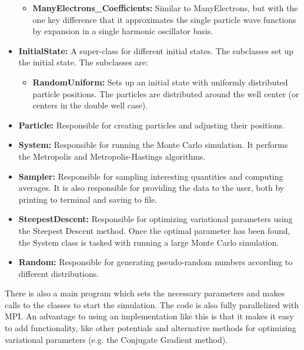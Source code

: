 \documentclass[../main.tex]{subfiles}
\begin{document}
\begin{appendices}
\begin{itemize}
\begin{itemize}
        \item \textbf{ManyElectrons\_Coefficients:} Similar to ManyElectrons, but with the one key difference that it approximates the single particle wave functions by expansion in a single harmonic oscillator basis.
    \end{itemize}
    \item {\bf InitialState:} A super-class for different initial states. The subclasses set up the initial state. The subclasses are:
    \begin{itemize}
        \item {\bf RandomUniform:} Sets up an initial state with uniformly distributed particle positions. The particles are distributed around the well center (or centers in the double well case).
    \end{itemize}
    \item {\bf Particle:} Responsible for creating particles and adjusting their positions.
    \item {\bf System:} Responsible for running the Monte Carlo simulation. It performs the Metropolis and Metropolis-Hastings algorithms.
    \item {\bf Sampler:} Responsible for sampling interesting quantities and computing averages. It is also responsible for providing the data to the user, both by printing to terminal and saving to file.
    \item {\bf SteepestDescent:} Responsible for optimizing variational parameters using the Steepest Descent method. Once the optimal parameter has been found, the System class is tasked with running a large Monte Carlo simulation.
    \item {\bf Random:} Responsible for generating pseudo-random numbers according to different distributions.
\end{itemize}

There is also a main program which sets the necessary parameters and makes calls to the classes to start the simulation. The code is also fully parallelized with MPI. An advantage to using an implementation like this is that it makes it easy to add functionality, like other potentials and alternative methods for optimizing variational parameters (e.g. the Conjugate Gradient method). 


\end{appendices}
\end{document}
